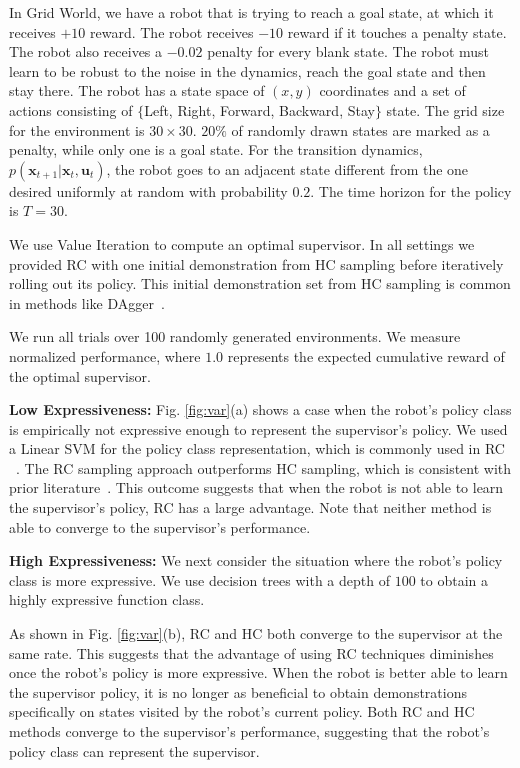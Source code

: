 \documentclass[10pt, conference]{ieeeconf}      %
\newcommand{\bu}{\mathbf{u}}
\newcommand{\bx}{\mathbf{x}}
\begin{document}
In Grid World, we have a robot that is trying to reach a goal state, at which it receives $+10$ reward. The robot receives $-10$ reward if it touches a penalty state. The robot also receives a $-0.02$ penalty for every blank state. The robot must learn to be robust to the noise in the dynamics, reach the goal state and then stay there.
The robot has a state space of $(x,y)$ coordinates and a set of actions consisting of $\lbrace$Left, Right, Forward, Backward, Stay$\rbrace$ state. The grid size for the environment is $30 \times 30$. $20\%$ of randomly drawn states are marked as a penalty, while only one is a goal state. For the transition dynamics, $p(\bx_{t+1}|\bx_{t},\bu_t)$, the robot goes to an adjacent state different from the one desired uniformly at random with probability $0.2$. The time horizon for the policy is $T=30$. 

We use Value Iteration to compute an optimal supervisor. In all settings we provided RC with one initial demonstration from HC sampling before iteratively rolling out its policy. This initial demonstration set from HC sampling is common in methods like DAgger~\cite{ross2010reduction}.

We run all trials over 100 randomly generated environments.
We measure normalized performance, where $1.0$ represents the expected cumulative reward of the optimal supervisor.

\noindent \textbf{Low Expressiveness:} Fig. \ref{fig:var}(a) shows a case when the robot's policy class is empirically not expressive enough to represent the supervisor's policy.
We used a Linear SVM for the policy class representation, which is commonly used in RC ~\cite{ross2010efficient,ross2010reduction,ross2013learning}. The RC sampling approach outperforms HC sampling, which is consistent with prior literature~\cite{ross2010efficient,ross2010reduction}.
This outcome suggests that when the robot is not able to learn the supervisor's policy, RC has a large advantage. Note that neither method is able to converge to the supervisor's performance. 

\noindent \textbf{High Expressiveness:}
We next consider the situation where the robot's policy class is more expressive. We use decision trees with a depth of $100$ to obtain a highly expressive function class. 

As shown in Fig. \ref{fig:var}(b), RC and HC both converge to the supervisor at the same rate. This suggests that the advantage of using RC techniques diminishes once the robot's policy is more expressive. When the robot is better able to learn the supervisor policy, it is no longer as beneficial to obtain demonstrations specifically on states visited by the robot's current policy. Both RC and HC methods converge to the supervisor's performance, suggesting that the robot's policy class can represent the supervisor.
\end{document}
